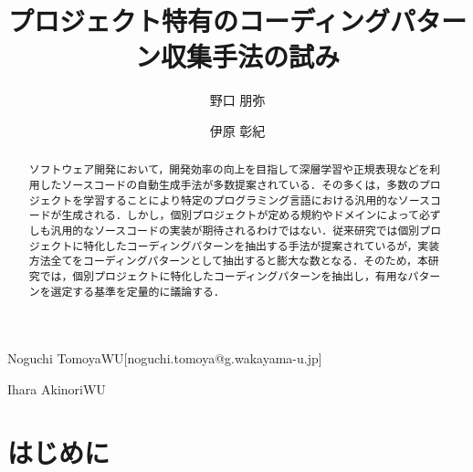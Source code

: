 \documentclass[submit,techrep,noauthor]{ipsj}
\begin{document}
\title{プロジェクト特有のコーディングパターン収集手法の試み}



\author{野口 朋弥}{Noguchi Tomoya}{WU}[noguchi.tomoya@g.wakayama-u.jp]
\author{伊原 彰紀}{Ihara Akinori}{WU}

\begin{abstract}
ソフトウェア開発において，開発効率の向上を目指して深層学習や正規表現などを利用したソースコードの自動生成手法が多数提案されている．その多くは，多数のプロジェクトを学習することにより特定のプログラミング言語における汎用的なソースコードが生成される．しかし，個別プロジェクトが定める規約やドメインによって必ずしも汎用的なソースコードの実装が期待されるわけではない．従来研究では個別プロジェクトに特化したコーディングパターンを抽出する手法が提案されているが，実装方法全てをコーディングパターンとして抽出すると膨大な数となる．そのため，本研究では，個別プロジェクトに特化したコーディングパターンを抽出し，有用なパターンを選定する基準を定量的に議論する．
\end{abstract}

\maketitle

\section{はじめに}
\end{document}
